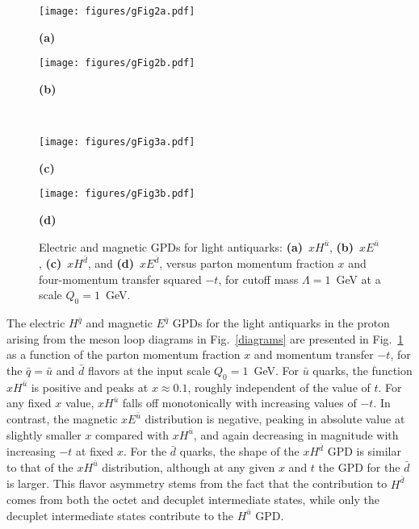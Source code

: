\documentclass[preprintnumbers,prd,superscriptaddress,preprint]{revtex4-1}
\begin{document}
\begin{figure}[] %
\begin{center}
    \begin{minipage}{0.45\linewidth}
        \centering
        \centerline{
        \texttt{[image: figures/gFig2a.pdf]}
        }
        \centerline{\small{\bf{(a)}}}
    \end{minipage}
    \begin{minipage}{0.45\linewidth}
        \centering
        \centerline{
        \texttt{[image: figures/gFig2b.pdf]}
        }
        \centerline{\small{\bf{(b)}}}
    \end{minipage}    
\\[0.4cm]
        \begin{minipage}{0.45\linewidth}
        \centering
        \centerline{
        \texttt{[image: figures/gFig3a.pdf]}
        }
        \centerline{\small{\bf{(c)}}}
    \end{minipage}
        \begin{minipage}{0.45\linewidth}
        \centering
        \centerline{
        \texttt{[image: figures/gFig3b.pdf]}
        }
        \centerline{\small{\bf{(d)}}}
    \end{minipage}
\caption{Electric and magnetic GPDs for light antiquarks: 
{\bf (a)}~$xH^{\bar{u}}$, 
{\bf (b)}~$xE^{\bar{u}}$, 
{\bf (c)}~$xH^{\bar{d}}$, and 
{\bf (d)}~$xE^{\bar{d}}$, versus parton momentum fraction $x$ and four-momentum transfer squared $-t$, for cutoff mass $\Lambda=1$~GeV at a scale $Q_0=1$~GeV.}
\label{3dubar}
\end{center}
\end{figure}

The electric $H^{\bar q}$ and magnetic $E^{\bar q}$ GPDs for the light antiquarks in the proton arising from the meson loop diagrams in Fig.~\ref{diagrams} are presented in Fig.~\ref{3dubar} as a function of the parton momentum fraction $x$ and momentum transfer $-t$, for the $\bar q = \bar u$ and $\bar d$ flavors at the input scale $Q_0=1$~GeV.
%
%
For $\bar u$ quarks, the function $xH^{\bar{u}}$ is positive and peaks at $x \approx 0.1$, roughly independent of the value of $t$.
For any fixed $x$ value, $xH^{\bar{u}}$ falls off monotonically with increasing values of $-t$.
In contrast, the magnetic $xE^{\bar{u}}$ distribution is negative, peaking in absolute value at slightly smaller $x$ compared with $xH^{\bar{u}}$, and again decreasing in magnitude with increasing $-t$ at fixed $x$.
%
For the $\bar d$ quarks, the shape of the $xH^{\bar{d}}$ GPD is similar to that of the $xH^{\bar{u}}$ distribution, although at any given  $x$ and $t$ the GPD for the $\bar d$ is larger.
This flavor asymmetry stems from the fact that the contribution to $H^{\bar{d}}$ comes from both the octet and decuplet intermediate states, while only the decuplet intermediate states contribute to the $H^{\bar{u}}$ GPD.
\end{document}
